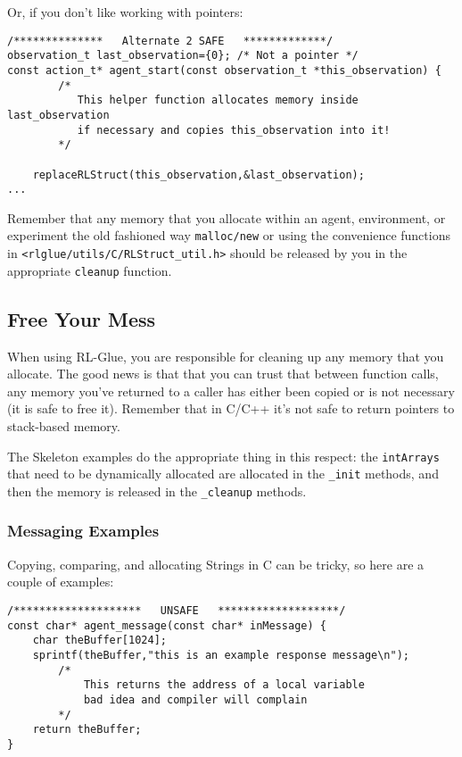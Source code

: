 \documentclass[11pt]{article}
\begin{document}
Or, if you don't like working with pointers:
\begin{verbatim}
/**************   Alternate 2 SAFE   *************/
observation_t last_observation={0}; /* Not a pointer */
const action_t* agent_start(const observation_t *this_observation) {
        /*
           This helper function allocates memory inside last_observation
           if necessary and copies this_observation into it!
        */
    
    replaceRLStruct(this_observation,&last_observation);
...
\end{verbatim}

Remember that any memory that you allocate within an agent, environment, or experiment the old fashioned way \texttt{malloc/new} or using the convenience functions in \texttt{<rlglue/utils/C/RLStruct\_util.h>} should be released
by you in the appropriate \texttt{cleanup} function.
\subsection{Free Your Mess}
When using RL-Glue, you are responsible for cleaning up any memory that you allocate. The good news is that that you can trust that between function calls, any memory you've returned to a caller has either been
copied or is not necessary (it is safe to free it).  Remember that in C/C++ it's not safe to return pointers to stack-based memory.

The Skeleton examples do the appropriate thing in this respect: the \texttt{intArrays} that need to be dynamically allocated are allocated in the \texttt{\_init} methods, and then the memory is released in the \texttt{\_cleanup} methods.

\subsubsection{Messaging Examples}
Copying, comparing, and allocating Strings in C can be tricky, so here are a couple of examples:

\begin{verbatim}
/********************   UNSAFE   *******************/
const char* agent_message(const char* inMessage) {
    char theBuffer[1024];
    sprintf(theBuffer,"this is an example response message\n");
        /*
            This returns the address of a local variable
            bad idea and compiler will complain
        */
    return theBuffer;
}
\end{verbatim}
\end{document}
